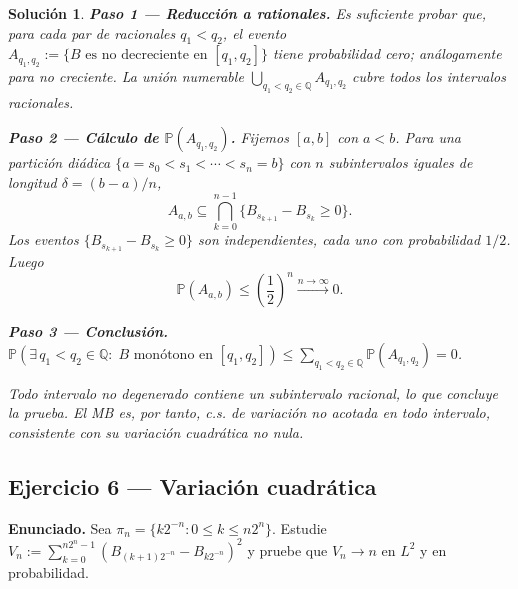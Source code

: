 \documentclass[12pt,letterpaper]{article}
\theoremstyle{ejercicio}
\theoremstyle{solucion}
\newtheorem*{solucion}{Solución}
\renewcommand{\P}{\mathbb{P}}
\begin{document}
\begin{solucion}

\textbf{Paso 1 — Reducción a rationales.}
Es suficiente probar que, para cada par de racionales $q_1<q_2$, el evento
$A_{q_1,q_2}:=\{B\text{ es no decreciente en }[q_1,q_2]\}$
tiene probabilidad cero; análogamente para no creciente.
La unión numerable $\bigcup_{q_1<q_2\in\mathbb{Q}}A_{q_1,q_2}$ cubre todos los intervalos racionales.

\textbf{Paso 2 — Cálculo de $\P(A_{q_1,q_2})$.}
Fijemos $[a,b]$ con $a<b$. Para una partición diádica $\{a=s_0<s_1<\cdots<s_n=b\}$
con $n$ subintervalos iguales de longitud $\delta=(b-a)/n$,
\[
  A_{a,b} \subseteq \bigcap_{k=0}^{n-1}\{B_{s_{k+1}}-B_{s_k}\ge 0\}.
\]
Los eventos $\{B_{s_{k+1}}-B_{s_k}\ge 0\}$ son independientes, cada uno con probabilidad
$1/2$. Luego
\[
  \P(A_{a,b}) \le \left(\frac{1}{2}\right)^n \xrightarrow{n\to\infty} 0.
\]

\textbf{Paso 3 — Conclusión.}
$\P\!\left(\exists\,q_1<q_2\in\mathbb{Q}:\;B\text{ monótono en }[q_1,q_2]\right)
\le \sum_{q_1<q_2\in\mathbb{Q}}\P(A_{q_1,q_2}) = 0$.

Todo intervalo no degenerado contiene un subintervalo racional, lo que concluye la prueba.
El MB es, por tanto, c.s. de variación no acotada en todo intervalo, consistente con su
variación cuadrática no nula.
\end{solucion}

\subsection*{Ejercicio 6 — Variación cuadrática}

\begin{recuadro}
\textbf{Enunciado.} Sea $\pi_n=\{k2^{-n}:0\le k\le n2^n\}$.
Estudie $V_n:=\sum_{k=0}^{n2^n-1}(B_{(k+1)2^{-n}}-B_{k2^{-n}})^2$
y pruebe que $V_n\to n$ en $L^2$ y en probabilidad.
\end{recuadro}
\end{document}
